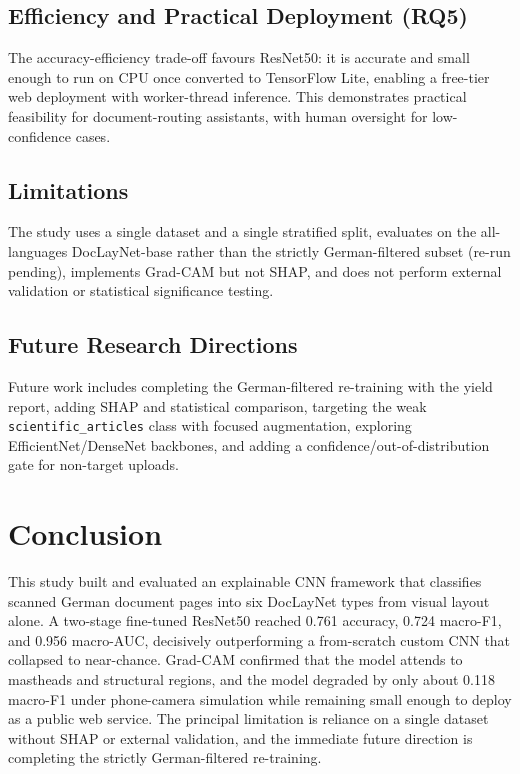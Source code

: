 \documentclass[preprint,12pt]{elsarticle}
\begin{document}
\subsection{Efficiency and Practical Deployment (RQ5)}
The accuracy-efficiency trade-off favours ResNet50: it is accurate and small
enough to run on CPU once converted to TensorFlow Lite, enabling a free-tier
web deployment with worker-thread inference.
This demonstrates practical feasibility for document-routing assistants, with
human oversight for low-confidence cases.

\subsection{Limitations}
The study uses a single dataset and a single stratified split, evaluates on the
all-languages DocLayNet-base rather than the strictly German-filtered subset
(re-run pending), implements Grad-CAM but not SHAP, and does not perform external
validation or statistical significance testing.

\subsection{Future Research Directions}
Future work includes completing the German-filtered re-training with the yield
report, adding SHAP and statistical comparison, targeting the weak
\texttt{scientific\_articles} class with focused augmentation, exploring
EfficientNet/DenseNet backbones, and adding a confidence/out-of-distribution gate
for non-target uploads.

\section{Conclusion}\label{sec:conclusion}
This study built and evaluated an explainable CNN framework that classifies
scanned German document pages into six DocLayNet types from visual layout alone.
A two-stage fine-tuned ResNet50 reached 0.761 accuracy, 0.724 macro-F1, and
0.956 macro-AUC, decisively outperforming a from-scratch custom CNN that
collapsed to near-chance.
Grad-CAM confirmed that the model attends to mastheads and structural regions,
and the model degraded by only about 0.118 macro-F1 under phone-camera
simulation while remaining small enough to deploy as a public web service.
The principal limitation is reliance on a single dataset without SHAP or external
validation, and the immediate future direction is completing the strictly
German-filtered re-training.
\end{document}
